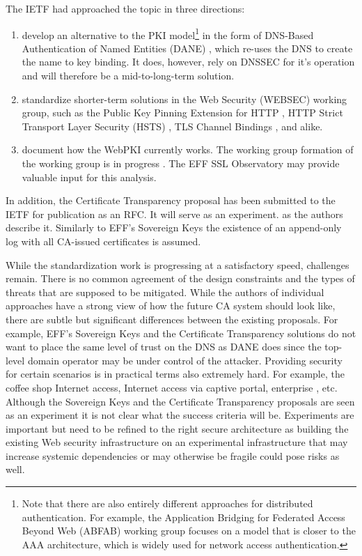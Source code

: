 \documentclass[a4paper, 10pt]{IEEEtran}
\begin{document}
The IETF had approached the topic in three directions: 
\begin{enumerate}
\item develop an alternative to the PKI model\footnote{Note that there are also entirely different approaches for distributed authentication. For example, the Application Bridging for Federated Access Beyond Web (ABFAB) working group \cite{draft-ietf-abfab-arch} focuses on a model that is closer to the AAA architecture, which is widely used for network access authentication.} in the form of DNS-Based Authentication of Named Entities (DANE) \cite{rfc6698}, which re-uses the DNS to create the name to key binding. It does, however, rely on DNSSEC for it's operation and will therefore be a mid-to-long-term solution. 
\item standardize shorter-term solutions in the Web Security (WEBSEC) \cite {WEBSEC} working group, such as the  Public Key Pinning Extension for HTTP \cite{draft-ietf-websec-key-pinning}, HTTP Strict Transport Layer Security (HSTS) \cite{rfc6797}, TLS Channel Bindings \cite{rfc5929}, and alike. 
\item document how the WebPKI currently works. The working group formation of the working group is in progress \cite{WPKOPS}. The EFF SSL Observatory \cite{ssl-observatory} may provide valuable input for this analysis. 
\end{enumerate}

In addition, the Certificate Transparency proposal \cite{draft-laurie-pki-sunlight} has been submitted to the IETF for publication as an RFC. It will serve as an experiment. as the authors describe it. Similarly to EFF's Sovereign Keys \cite{sovereign-keys} the existence of an append-only log with all CA-issued certificates is assumed. 

While the standardization work is progressing at a satisfactory speed, challenges remain. There is no common agreement of the design constraints and the types of threats that are supposed to be mitigated. While the authors of individual approaches have a strong view of how the future CA system should look like, there are subtle but significant differences between the existing proposals. For example, EFF's Sovereign Keys and the Certificate Transparency solutions do not want to place the same level of trust on the DNS as DANE does since the top-level domain operator may be under control of the attacker. Providing security for certain scenarios is in practical terms also extremely hard. For example, the coffee shop Internet access, Internet access via captive portal, enterprise , etc. Although the Sovereign Keys and the Certificate Transparency proposals are seen as an experiment it is not clear what the success criteria will be. Experiments are important but need to be refined to the right secure architecture as building the existing Web security infrastructure on an experimental infrastructure that may increase systemic dependencies or may otherwise be fragile could pose risks as well.
\end{document}
